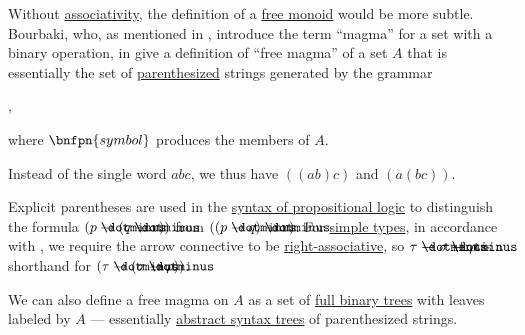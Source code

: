 \begin{example}\label{ex:free_magma}
  Without \hyperref[def:binary_operation/associative]{associativity}, the definition of a \hyperref[def:free_monoid]{free monoid} would be more subtle. Bourbaki, who, as mentioned in , introduce the term \enquote{magma} for a set with a binary operation, in \cite[81]{Bourbaki1998Algebra1to3} give a definition of \enquote{free magma} of a set \( A \) that is essentially the set of \hyperref[def:paired_delimiters]{parenthesized} strings generated by the grammar
  \begin{bnf*}
     {\bnftsq{(} \bnfsp {} \bnfsp {} \bnfsp \bnftsq{)} \bnfor {} \bnfor \varepsilon},
  \end{bnf*}
  where \( \bnfpn{symbol} \) produces the members of \( A \).

  Instead of the single word \( abc \), we thus have \( ((ab)c) \) and \( (a(bc)) \).

  Explicit parentheses are used in the \hyperref[def:propositional_syntax]{syntax of propositional logic} to distinguish the formula \( (p \synimplies (q \synimplies r)) \) from \( ((p \synimplies q) \synimplies r) \). For \hyperref[def:simple_type]{simple types}, in accordance with , we require the arrow connective to be \hyperref[rem:binary_operation_syntax_trees/associativity]{right-associative}, so \( \tau \synimplies \sigma \synimplies \rho \) is a shorthand for \( (\tau \synimplies (\sigma \synimplies \rho)) \).

  We can also define a free magma on \( A \) as a set of \hyperref[def:n_ary_tree]{full binary trees} with leaves labeled by \( A \) --- essentially  \hyperref[def:propositional_formula_ast]{abstract syntax trees} of parenthesized strings.
\end{example}


